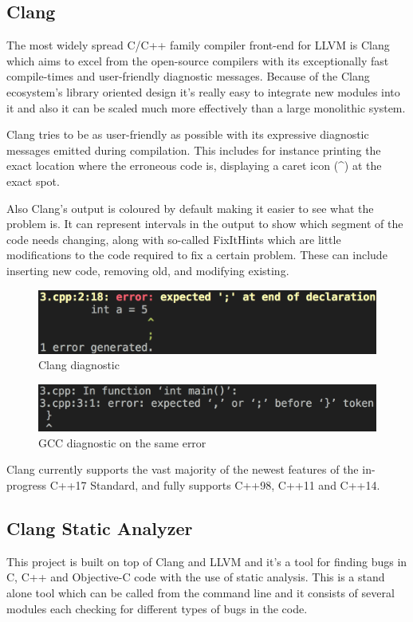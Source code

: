 \subsection{Clang}
\par The most widely spread C/C++ family compiler front-end for LLVM is Clang which aims to excel from the open-source compilers with its exceptionally fast compile-times and user-friendly diagnostic messages\cite{clang_features}. Because of the Clang ecosystem's library oriented design it's really easy to integrate new modules into it and also it can be scaled much more effectively than a large monolithic system. \medskip
\par Clang tries to be as user-friendly as possible with its expressive diagnostic messages emitted during compilation. This includes for instance printing the exact location where the erroneous code is, displaying a caret icon (\textasciicircum) at the exact spot. \medskip 
\par Also Clang's output is coloured by default making it easier to see what the problem is. It can represent intervals in the output to show which segment of the code needs changing, along with so-called FixItHints which are little modifications to the code required to fix a certain problem. These can include inserting new code, removing old, and modifying existing.
\begin{figure}[h]
	\caption{Clang diagnostic}
	\includegraphics[scale = 0.42]{images/clang_diag}
\end{figure}
\begin{figure}[h]
	\caption{GCC diagnostic on the same error}
	\includegraphics[scale = 0.352]{images/gcc_diag}
\end{figure}
\par Clang currently supports the vast majority of the newest features of the in-progress C++17 Standard, and fully supports C++98, C++11 and C++14\cite{clang_language_support}. 
\subsection{Clang Static Analyzer}
\par This project is built on top of Clang and LLVM and it's a tool for finding bugs in C, C++ and Objective-C code with the use of static analysis. This is a stand alone tool which can be called from the command line and it consists of several modules each checking for different types of bugs in the code.
